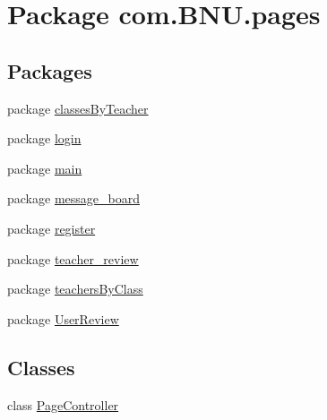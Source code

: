 \hypertarget{namespacecom_1_1_b_n_u_1_1pages}{}\section{Package com.\+B\+N\+U.\+pages}
\label{namespacecom_1_1_b_n_u_1_1pages}
\subsection*{Packages}
\begin{DoxyCompactItemize}
\item 
package \mbox{\hyperlink{namespacecom_1_1_b_n_u_1_1pages_1_1classes_by_teacher}{classes\+By\+Teacher}}
\item 
package \mbox{\hyperlink{namespacecom_1_1_b_n_u_1_1pages_1_1login}{login}}
\item 
package \mbox{\hyperlink{namespacecom_1_1_b_n_u_1_1pages_1_1main}{main}}
\item 
package \mbox{\hyperlink{namespacecom_1_1_b_n_u_1_1pages_1_1message__board}{message\+\_\+board}}
\item 
package \mbox{\hyperlink{namespacecom_1_1_b_n_u_1_1pages_1_1register}{register}}
\item 
package \mbox{\hyperlink{namespacecom_1_1_b_n_u_1_1pages_1_1teacher__review}{teacher\+\_\+review}}
\item 
package \mbox{\hyperlink{namespacecom_1_1_b_n_u_1_1pages_1_1teachers_by_class}{teachers\+By\+Class}}
\item 
package \mbox{\hyperlink{namespacecom_1_1_b_n_u_1_1pages_1_1_user_review}{User\+Review}}
\end{DoxyCompactItemize}
\subsection*{Classes}
\begin{DoxyCompactItemize}
\item 
class \mbox{\hyperlink{classcom_1_1_b_n_u_1_1pages_1_1_page_controller}{Page\+Controller}}
\end{DoxyCompactItemize}
